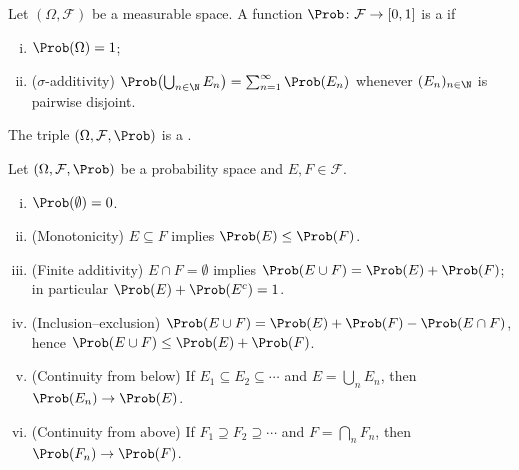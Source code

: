 \begin{definition}\label{def:probability-measure}
	Let $(\Omega,\mathcal{F})$ be a measurable space. A function $\Prob\colon\mathcal{F}\to[0,1]$ is a
	 if
	\begin{enumerate}[(i)]
		\item $\Prob(\Omega)=1$;
		\item ($\sigma$-additivity) $\Prob\bigl(\bigcup_{n\in\N}E_n\bigr)
			      =\sum_{n=1}^{\infty}\Prob(E_n)$ whenever $(E_n)_{n\in\N}$ is pairwise
		      disjoint.
	\end{enumerate}
	The triple $(\Omega,\mathcal{F},\Prob)$ is a .
\end{definition}

\begin{proposition}\label{prop:probability-basics}
	Let $(\Omega,\mathcal{F},\Prob)$ be a probability space and $E,F\in\mathcal{F}$.
	\begin{enumerate}[(i)]
		\item $\Prob(\emptyset)=0$.
		\item (Monotonicity) $E\subseteq F$ implies $\Prob(E)\leq\Prob(F)$.
		\item (Finite additivity) $E\cap F=\emptyset$ implies
		      $\Prob(E\cup F)=\Prob(E)+\Prob(F)$; in particular
		      $\Prob(E)+\Prob(E^{c})=1$.
		\item (Inclusion--exclusion)
		      $\Prob(E\cup F)=\Prob(E)+\Prob(F)-\Prob(E\cap F)$, hence
		      $\Prob(E\cup F)\leq\Prob(E)+\Prob(F)$.
		\item (Continuity from below) If $E_1\subseteq E_2\subseteq\cdots$ and
		      $E=\bigcup_nE_n$, then $\Prob(E_n)\to\Prob(E)$.
		\item (Continuity from above) If $F_1\supseteq F_2\supseteq\cdots$ and
		      $F=\bigcap_nF_n$, then $\Prob(F_n)\to\Prob(F)$.
	\end{enumerate}
\end{proposition}

